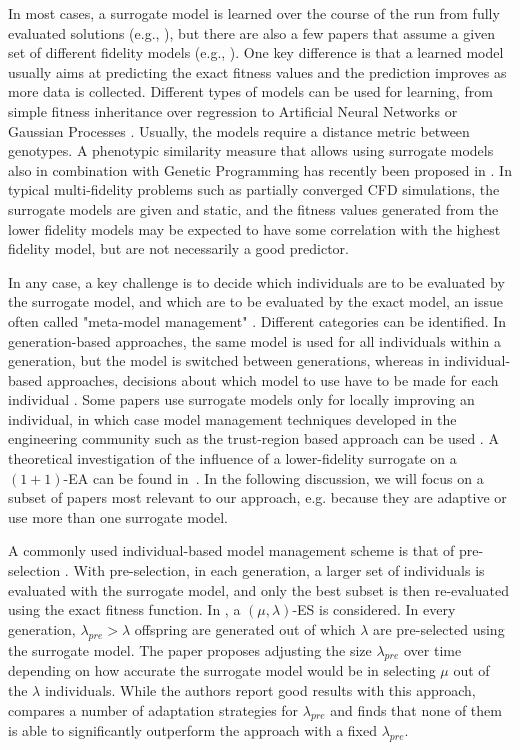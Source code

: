 In most cases, a surrogate model is learned over the course of the run from fully evaluated solutions (e.g., \cite{BeKe01,Emmerich2002,Lim2010}), but there are also a few papers that assume a given set of different fidelity models (e.g., \cite{EAPG98}). One key difference is that a learned model usually aims at predicting the exact fitness values and the prediction improves as more data is collected. Different types of models can be used for learning, from simple fitness inheritance \cite{SGP01} over regression \cite{BrSc05} to Artificial Neural Networks \cite{Jin2002} or Gaussian Processes \cite{BeKe01,LZG14}. Usually, the models require a distance metric between genotypes. A phenotypic similarity measure that allows using surrogate models also in combination with Genetic Programming has recently been proposed in \cite{HiBr15}.
In typical multi-fidelity problems such as partially converged CFD simulations, the surrogate models are given and static, and the fitness values generated from the lower fidelity models may be expected to have some correlation with the highest fidelity model, but are not necessarily a good predictor.

In any case, a key challenge is to decide which individuals are to be evaluated by the surrogate model, and which are to be evaluated by the exact model, an issue often called "meta-model management" \cite{GJS07}. Different categories can be identified. In generation-based approaches, the same model is used for all individuals within a generation, but the model is switched between generations, whereas in individual-based approaches, decisions about which model to use have to be made for each individual \cite{Jin2005}. Some papers use surrogate models only for locally improving an individual, in which case model management techniques developed in the engineering community such as the trust-region based approach can be used \cite{ONK03,ZOL07,Zhou2007}. 
A theoretical investigation of the influence of a lower-fidelity surrogate on a $(1+1)$-EA can be found in~\cite{CXZ13}.
In the following discussion, we will focus on a subset of papers most relevant to our approach, e.g. because they are adaptive or use more than one surrogate model. 

A commonly used individual-based model management scheme is that of pre-selection \cite{USZ04,Emmerich2002}. With pre-selection, in each generation, a larger set of individuals is evaluated with the surrogate model, and only the best subset is then re-evaluated using the exact fitness function. In \cite{USZ04},  a $(\mu,\lambda)$-ES is considered. 
In every generation, $\lambda_{pre} > \lambda$ offspring are generated out of which $\lambda$ are pre-selected using the surrogate model.
The paper proposes adjusting the size $\lambda_{pre}$ over time depending on how accurate the surrogate model would be in selecting $\mu$ out of the $\lambda$ individuals. 
While the authors report good results with this approach, \cite{GJS07} compares a number of adaptation strategies for $\lambda_{pre}$ and finds that none of them is able to significantly outperform the approach with a fixed $\lambda_{pre}$.

